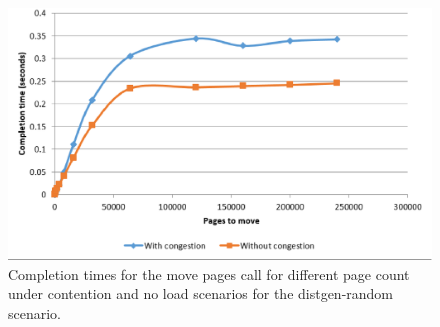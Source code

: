 \begin{figure}[th]  
	\centering
		\includegraphics[width=.8\textwidth]{figures/mov-pages-time.eps}
		\caption{Completion times for the move pages call for different page count under contention and no load scenarios for the distgen-random scenario.}
		\label{fig:mov-pages-time.eps}
\end{figure}
